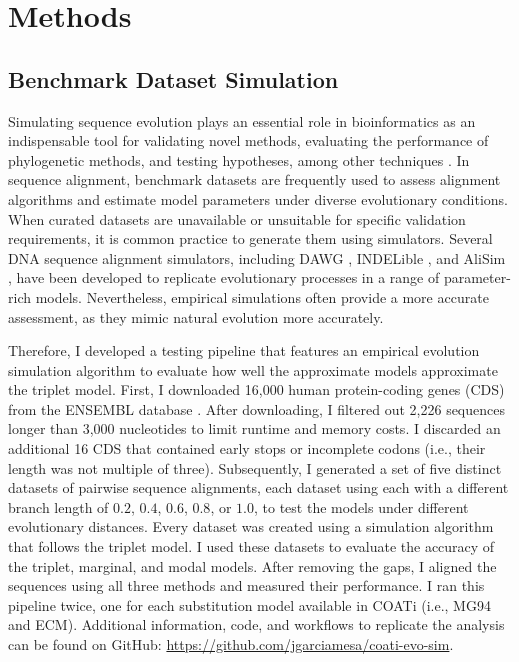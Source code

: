 \section{Methods}

\subsection{Benchmark Dataset Simulation}

Simulating sequence evolution plays an essential role in bioinformatics as an indispensable tool for validating novel methods, evaluating the performance of phylogenetic methods, and testing hypotheses, among other techniques \citep{ly2022alisim}. In sequence alignment, benchmark datasets are frequently used to assess alignment algorithms and estimate model parameters under diverse evolutionary conditions. When curated datasets are unavailable or unsuitable for specific validation requirements, it is common practice to generate them using simulators. Several DNA sequence alignment simulators, including DAWG \citep{cartwright2005dawg}, INDELible \citep{fletcher2009indelible}, and AliSim \citep{ly2022alisim}, have been developed to replicate evolutionary processes in a range of parameter-rich models. Nevertheless, empirical simulations often provide a more accurate assessment, as they mimic natural evolution more accurately.

Therefore, I developed a testing pipeline that features an empirical evolution simulation algorithm to evaluate how well the approximate models approximate the triplet model. First, I downloaded 16,000 human protein-coding genes (CDS) from the ENSEMBL database \citep{ensembl_hubbard_2002}. After downloading, I filtered out 2,226 sequences longer than 3,000 nucleotides to limit runtime and memory costs. I discarded an additional 16 CDS that contained early stops or incomplete codons (i.e., their length was not multiple of three). Subsequently, I generated a set of five distinct datasets of pairwise sequence alignments, each dataset using each with a different branch length of $0.2$, $0.4$, $0.6$, $0.8$, or $1.0$, to test the models under different evolutionary distances. Every dataset was created using a simulation algorithm that follows the triplet model. I used these datasets to evaluate the accuracy of the triplet, marginal, and modal models. After removing the gaps, I aligned the sequences using all three methods and measured their performance. I ran this pipeline twice, one for each substitution model available in COATi (i.e., MG94 and ECM). Additional information, code, and workflows to replicate the analysis can be found on GitHub: \url{https://github.com/jgarciamesa/coati-evo-sim}.


